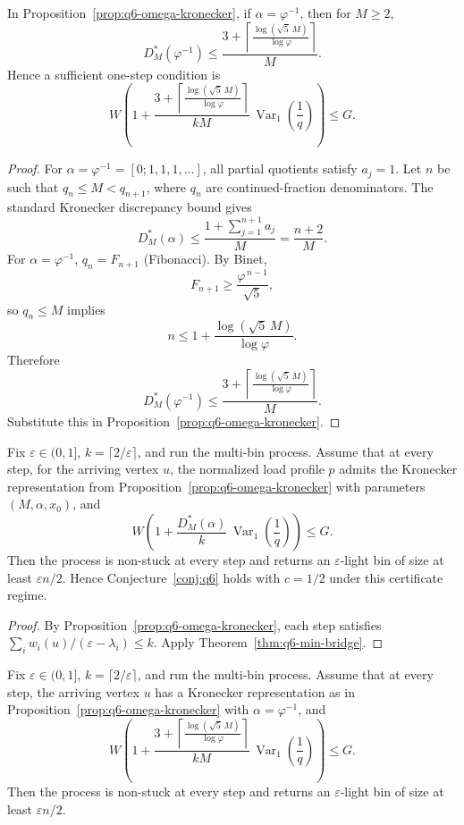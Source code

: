 \begin{corollary}
\label{cor:q6-omega-golden-explicit}
In Proposition~\ref{prop:q6-omega-kronecker}, if
\(\alpha=\varphi^{-1}\), then for \(M\ge 2\),
\[
D_M^*(\varphi^{-1})
\le
\frac{3+\left\lceil \frac{\log(\sqrt5\,M)}{\log\varphi}\right\rceil}{M}.
\]
Hence a sufficient one-step condition is
\[
W\!\left(
1+\frac{3+\left\lceil \frac{\log(\sqrt5\,M)}{\log\varphi}\right\rceil}{kM}\,
\operatorname{Var}_1\!\left(\frac1q\right)
\right)\le G.
\]
\end{corollary}

\begin{proof}
For \(\alpha=\varphi^{-1}=[0;1,1,1,\dots]\), all partial quotients satisfy
\(a_j=1\). Let \(n\) be such that \(q_n\le M<q_{n+1}\), where \(q_n\) are
continued-fraction denominators. The standard Kronecker discrepancy bound
gives
\[
D_M^*(\alpha)\le \frac{1+\sum_{j=1}^{n+1}a_j}{M}
=\frac{n+2}{M}.
\]
For \(\alpha=\varphi^{-1}\), \(q_n=F_{n+1}\) (Fibonacci). By Binet,
\[
F_{n+1}\ge \frac{\varphi^{\,n-1}}{\sqrt5},
\]
so \(q_n\le M\) implies
\[
n\le 1+\frac{\log(\sqrt5\,M)}{\log\varphi}.
\]
Therefore
\[
D_M^*(\varphi^{-1})
\le
\frac{3+\left\lceil \frac{\log(\sqrt5\,M)}{\log\varphi}\right\rceil}{M}.
\]
Substitute this in Proposition~\ref{prop:q6-omega-kronecker}.
\end{proof}

\begin{theorem}[Kronecker-certificate route to the
\(c=1/2\) endpoint]\label{thm:q6-omega-kronecker-route}
Fix \(\varepsilon\in(0,1]\), \(k=\lceil 2/\varepsilon\rceil\), and run the
multi-bin process.
Assume that at every step, for the arriving vertex \(u\),
the normalized load profile \(p\) admits the Kronecker representation from
Proposition~\ref{prop:q6-omega-kronecker} with parameters
\((M,\alpha,x_0)\), and
\[
W\left(1+\frac{D_M^*(\alpha)}{k}\,
\operatorname{Var}_1\!\left(\frac1q\right)\right)\le G.
\]
Then the process is non-stuck at every step and returns an
\(\varepsilon\)-light bin of size at least \(\varepsilon n/2\).
Hence Conjecture~\ref{conj:q6} holds with \(c=1/2\) under this
certificate regime.
\end{theorem}

\begin{proof}
By Proposition~\ref{prop:q6-omega-kronecker}, each step satisfies
\(\sum_i w_i(u)/(\varepsilon-\lambda_i)\le k\).
Apply Theorem~\ref{thm:q6-min-bridge}.
\end{proof}

\begin{corollary}
\label{cor:q6-omega-kronecker-route-golden}
Fix \(\varepsilon\in(0,1]\), \(k=\lceil 2/\varepsilon\rceil\), and run the
multi-bin process.
Assume that at every step, the arriving vertex \(u\) has a Kronecker
representation as in Proposition~\ref{prop:q6-omega-kronecker} with
\(\alpha=\varphi^{-1}\), and
\[
W\!\left(
1+\frac{3+\left\lceil \frac{\log(\sqrt5\,M)}{\log\varphi}\right\rceil}{kM}\,
\operatorname{Var}_1\!\left(\frac1q\right)
\right)\le G.
\]
Then the process is non-stuck at every step and returns an
\(\varepsilon\)-light bin of size at least \(\varepsilon n/2\).
\end{corollary}

